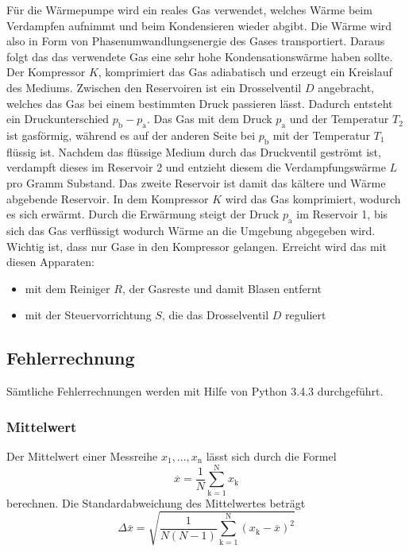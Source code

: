 Für die Wärmepumpe wird ein reales Gas verwendet, welches Wärme beim Verdampfen aufnimmt und beim Kondensieren wieder abgibt. Die Wärme wird also in Form von Phasenumwandlungsenergie des Gases transportiert. Daraus folgt das das verwendete Gas eine sehr hohe Kondensationswärme haben sollte. Der Kompressor $K$, komprimiert das Gas adiabatisch und erzeugt ein Kreislauf des Mediums. Zwischen den Reservoiren ist ein Drosselventil $D$ angebracht, welches das Gas bei einem bestimmten Druck passieren lässt. Dadurch entsteht ein Druckunterschied $p_\text{b} - p_\text{a}$. Das Gas mit dem Druck $p_\text{a}$ und der Temperatur $T_\text{2}$ ist gasförmig, während es auf der anderen Seite bei $p_\text{b}$ mit der Temperatur $T_\text{1}$ flüssig ist. Nachdem das flüssige Medium durch das Druckventil geströmt ist, verdampft dieses im Reservoir 2 und entzieht diesem die Verdampfungswärme $L$ pro Gramm Substand. Das zweite Reservoir ist damit das kältere und Wärme abgebende Reservoir. In dem Kompressor $K$ wird das Gas komprimiert, wodurch es sich erwärmt. Durch die Erwärmung steigt der Druck $p_\text{a}$ im Reservoir 1, bis sich das Gas verflüssigt wodurch Wärme an die Umgebung abgegeben wird. \\
Wichtig ist, dass nur Gase in den Kompressor gelangen. Erreicht wird das mit diesen Apparaten:
\begin{itemize}
\item mit dem Reiniger $R$, der Gasreste und damit Blasen entfernt
\item mit der Steuervorrichtung $S$, die das Drosselventil $D$ reguliert
\end{itemize}

\subsection{Fehlerrechnung}
Sämtliche Fehlerrechnungen werden mit Hilfe von Python 3.4.3 durchgeführt.
\subsubsection{Mittelwert}
Der Mittelwert einer Messreihe $x_\text{1}, ... ,x_\text{n}$ lässt sich durch die Formel
\begin{equation}
	\overline{x} = \frac{1}{N} \sum_{\text{k}=1}^\text{N} x_\text{k}
	\label{eqn:ave}
\end{equation}
berechnen. Die Standardabweichung des Mittelwertes beträgt
\begin{equation}
	\Delta \overline{x} = \sqrt{ \frac{1}{N(N-1)} \sum_{\text{k}=1}^\text{N} (x_\text{k} - \overline{x})^2}
	\label{eqn:var}
\end{equation}

